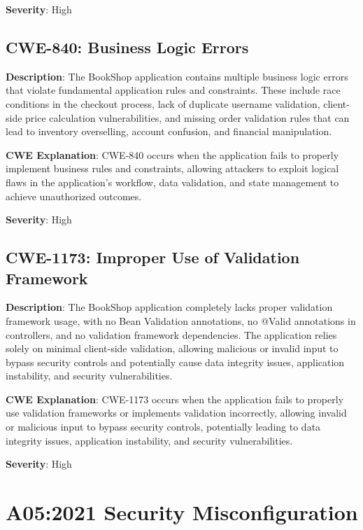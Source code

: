 \documentclass[]{UCD_CS_FYP_Report}
\begin{document}
\textbf{Severity}: High



\section{CWE-840: Business Logic Errors}

\textbf{Description}: The BookShop application contains multiple business logic errors that violate fundamental application rules and constraints. These include race conditions in the checkout process, lack of duplicate username validation, client-side price calculation vulnerabilities, and missing order validation rules that can lead to inventory overselling, account confusion, and financial manipulation.

\textbf{CWE Explanation}: CWE-840 occurs when the application fails to properly implement business rules and constraints, allowing attackers to exploit logical flaws in the application's workflow, data validation, and state management to achieve unauthorized outcomes.

\textbf{Severity}: High



\section{CWE-1173: Improper Use of Validation Framework}

\textbf{Description}: The BookShop application completely lacks proper validation framework usage, with no Bean Validation annotations, no @Valid annotations in controllers, and no validation framework dependencies. The application relies solely on minimal client-side validation, allowing malicious or invalid input to bypass security controls and potentially cause data integrity issues, application instability, and security vulnerabilities.

\textbf{CWE Explanation}: CWE-1173 occurs when the application fails to properly use validation frameworks or implements validation incorrectly, allowing invalid or malicious input to bypass security controls, potentially leading to data integrity issues, application instability, and security vulnerabilities.

\textbf{Severity}: High




\chapter{A05:2021 Security Misconfiguration}
\end{document}
